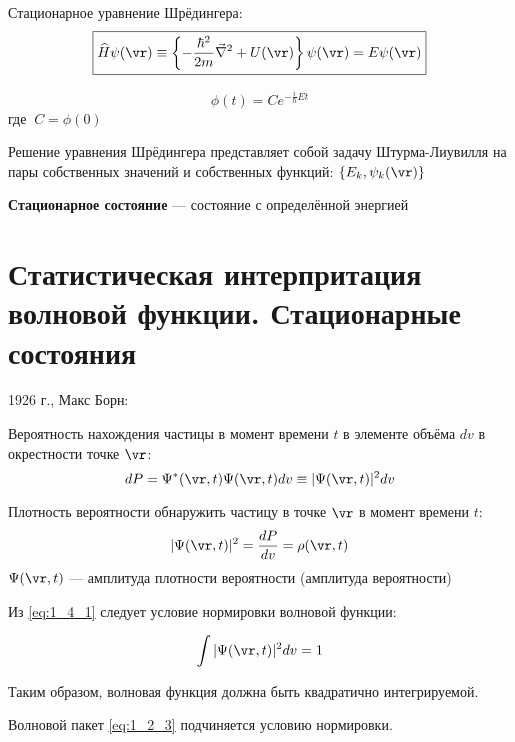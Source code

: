 Стационарное уравнение Шрёдингера:\\
\begin{equation}
\label{eq:1_3_6}
\boxed{\widehat{H} \psi(\vr) \equiv \left\{ -\frac{\hbar^2}{2m} \vec{\nabla}^2 + U(\vr) \right\}\psi(\vr) = E\psi(\vr)}
\end{equation}

$$\phi(t)=C e^{-\frac{i}{\hbar}Et}$$
где $~C=\phi(0)$

Решение уравнения Шрёдингера представляет собой задачу Штурма-Лиувилля на пары собственных значений и собственных функций: $\{E_k, \psi_k(\vr)\}$

\textbf{Стационарное состояние} --- состояние с определённой энергией

\section{Статистическая интерпритация волновой функции. Стационарные состояния}

1926 г., Макс Борн: 

\begin{defn}
Вероятность нахождения частицы в момент времени $t$ в элементе объёма $dv$ в окрестности точке $\vr$:
\begin{equation}
\label{eq:1_4_1}
dP = \Psi^*(\vr,t) \Psi(\vr,t) dv \equiv|\Psi(\vr,t)|^2dv
\end{equation}
\end{defn}

\begin{defn}
Плотность вероятности обнаружить частицу в точке $\vr$ в момент времени $t$:
\begin{equation}
\label{eq:1_4_2}
|\Psi(\vr,t)|^2 = \frac{dP}{dv} = \rho(\vr,t)
\end{equation}
$\Psi(\vr,t)$ --- амплитуда плотности вероятности (амплитуда вероятности)
\end{defn}



Из \eqref{eq:1_4_1} следует условие нормировки волновой функции:

\begin{equation}
\label{eq:1_4_3}
\int |\Psi(\vr,t)|^2 dv = 1
\end{equation}

Таким образом, волновая функция должна быть квадратично интегрируемой.\\

\begin{exmpl}
Волновой пакет \eqref{eq:1_2_3} подчиняется условию нормировки.
\end{exmpl}

